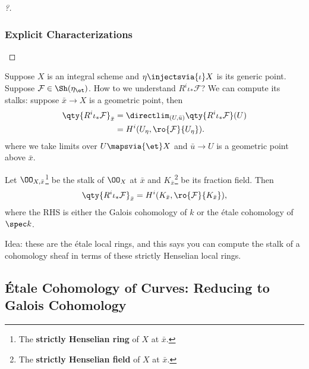 \begin{proof}[?]
\hypertarget{explicit-characterizations-1}{%
\subsubsection{Explicit
Characterizations}\label{explicit-characterizations-1}}

\end{proof}

\begin{example}[?]

Suppose \(X\) is an integral scheme and \(\eta\injectsvia{\iota} X\) is
its generic point. Suppose \(\mathcal{F}\in \Sh(\eta_\et)\). How to we
understand \(R^i \iota_* \mathcal{F}\)? We can compute its stalks:
suppose \(\bar x \to X\) is a geometric point, then
\begin{align*}  
\qty{R^i \iota_* \mathcal{F}}_{\bar x} 
&= 
\directlim_{(U, \bar u)} \qty{R^i \iota_* \mathcal{F}}(U) \\
&=
H^i(U_\eta, \ro{\mathcal{F}}{U_\eta})
.\end{align*} where we take limits over \(U\mapsvia{\et} X\) and
\(\bar u\to U\) is a geometric point above \(\bar x\).

\begin{exercise}

Let \(\OO_{X, \bar x}\)\footnote{The \textbf{strictly Henselian ring} of
  \(X\) at \(\bar x\).} be the stalk of \(\OO_X\) at \(\bar x\) and
\(K_{\bar x}\)\footnote{The \textbf{strictly Henselian field} of \(X\)
  at \(\bar x\).} be its fraction field. Then
\begin{align*}  
\qty{R^i \iota_* \mathcal{F}}_{\bar x}
=
H^i(K_{\bar x}, \ro{\mathcal{F}} {K_{\bar x}} )
,\end{align*} where the RHS is either the Galois cohomology of \(k\) or
the étale cohomology of \(\spec k\).

Idea: these are the étale local rings, and this says you can compute the
stalk of a cohomology sheaf in terms of these strictly Henselian local
rings.

\end{exercise}

\end{example}

\hypertarget{uxe9tale-cohomology-of-curves-reducing-to-galois-cohomology}{%
\subsection{Étale Cohomology of Curves: Reducing to Galois
Cohomology}\label{uxe9tale-cohomology-of-curves-reducing-to-galois-cohomology}}

